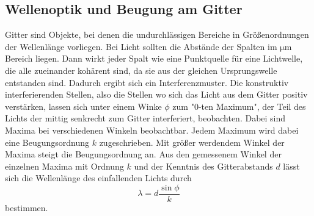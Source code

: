 \subsection{Wellenoptik und Beugung am Gitter}
Gitter sind Objekte, bei denen die undurchlässigen Bereiche in Größenordnungen der Wellenlänge vorliegen.
Bei Licht sollten die Abstände der Spalten im $\unit{\micro\meter}$ Bereich liegen. Dann wirkt jeder Spalt wie eine
Punktquelle für eine Lichtwelle, die alle zueinander kohärent sind, da sie aus der gleichen Ursprungswelle entstanden sind.
Dadurch ergibt sich ein Interferenzmuster. Die konstruktiv interferierenden Stellen, also die Stellen wo sich das Licht aus dem Gitter positiv verstärken,
lassen sich unter einem Winke $\phi$ zum "0-ten Maximum", der Teil des Lichts der mittig senkrecht zum Gitter interferiert, beobachten. Dabei sind Maxima bei verschiedenen Winkeln
beobachtbar. Jedem Maximum wird dabei eine Beugungsordnung $k$ zugeschrieben. Mit größer werdendem Winkel der
Maxima steigt die Beugungsordnung an. Aus den gemessenem Winkel der einzelnen Maxima mit Ordnung $k$ und der Kenntnis des Gitterabstands $d$
lässt sich die Wellenlänge des einfallenden Lichts durch
\begin{equation}
    \lambda=d\frac{\sin{\phi}}{k}
    \label{eq:Beugung}
\end{equation}
bestimmen.
\cite{V400}
